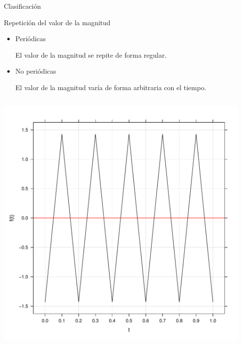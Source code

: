 \documentclass[aspectratio=169, usenames,svgnames,dvipsnames]{beamer}
\begin{document}
\begin{frame}[label={sec:org86401f1}]{Clasificación}
\begin{block}{Repetición del valor de la magnitud}
\begin{itemize}
\item Periódicas

El valor de la magnitud se repite de forma regular.

\item No periódicas

El valor de la magnitud varía de forma arbitraria con el tiempo.
\end{itemize}
\end{block}
\begin{columns}
\begin{column}{0.5\columnwidth}
\begin{center}
\includegraphics[height=0.52\textheight]{../figs/triangular_periodica.pdf}
\end{center}
\end{column}
\begin{column}{0.5\columnwidth}
\begin{center}

\end{center}
\end{column}
\end{columns}
\end{frame}
\end{document}
